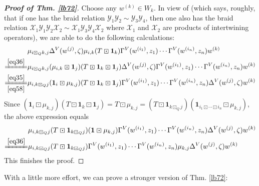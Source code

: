 \documentclass[11pt,b5paper,notitlepage]{article}
\theoremstyle{definition}
\theoremstyle{plain}
\newcommand{\mc}{\mathcal}
\newcommand{\idt}{\mathbf{1}}
\numberwithin{equation}{section}
\begin{document}
\begin{proof}[\textbf{Proof of Thm. \ref{lb72}}]
Choose any $w^{(k)}\in W_k$. In view of \cite[Prop. 2.11]{Gui19a} (which says, roughly, that if one has the braid relation $\mc Y_1\mc Y_2\sim\mc Y_3\mc Y_4$, then one also has the braid relation $\mc X_1\mc Y_1\mc Y_2\mc X_2\sim\mc X_1\mc Y_3\mc Y_4\mc X_2$ where $\mc X_1$ and $\mc X_2$ are products of intertwining operators), we are able to do the following calculations:
\begin{align*}
&\mu_{i\boxdot_Qk,j}\Delta^V(w^{(j)},\zeta)\mu_{i,k}(T\boxdot\idt_k) \Gamma^V(w^{(i_1)},z_1)\cdots \Gamma^V(w^{(i_n)},z_n)w^{(k)}\\
\xlongequal{\eqref{eq36}}&\mu_{i\boxdot_Qk,j}(\mu_{i,k}\boxdot\idt_j)(T\boxdot\idt_k\boxdot\idt_j)\Delta^V(w^{(j)},\zeta) \Gamma^V(w^{(i_1)},z_1)\cdots \Gamma^V(w^{(i_n)},z_n)w^{(k)}\\
\xlongequal[\eqref{eq58}]{\eqref{eq35}}&\mu_{i,k\boxdot_Qj}(\idt_i\boxdot\mu_{k,j})(T\boxdot\idt_k\boxdot\idt_j) \Gamma^V(w^{(i_1)},z_1)\cdots \Gamma^V(w^{(i_n)},z_n)\Delta^V(w^{(j)},\zeta)w^{(k)}
\end{align*}
Since $(\idt_i\boxdot\mu_{k,j})(T\boxdot\idt_k\boxdot\idt_j)=T\boxdot\mu_{k,j}=(T\boxdot\idt_{k\boxdot_Qj})(\idt_{i_1\boxdot\cdots\boxdot i_n}\boxdot\mu_{k,j})$, the above expression equals
\begin{align*}
&\mu_{i,k\boxdot_Qj}(T\boxdot\idt_{k\boxdot_Qj})(\idt\boxdot\mu_{k,j})\Gamma^V(w^{(i_1)},z_1)\cdots \Gamma^V(w^{(i_n)},z_n)\Delta^V(w^{(j)},\zeta)w^{(k)}\\
\xlongequal{\eqref{eq36}}&\mu_{i,k\boxdot_Qj}(T\boxdot\idt_{k\boxdot_Qj})\Gamma^V(w^{(i_1)},z_1)\cdots \Gamma^V(w^{(i_n)},z_n)\mu_{k,j}\Delta^V(w^{(j)},\zeta)w^{(k)}
\end{align*}
This finishes the proof.
\end{proof}



With a little more effort, we can prove a stronger version of Thm. \ref{lb72}:
\end{document}
